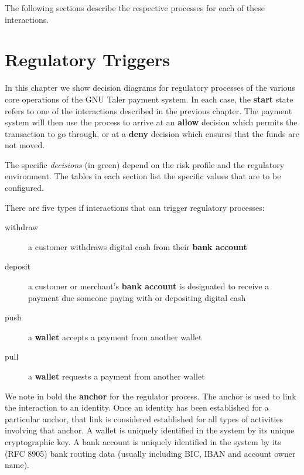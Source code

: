 \documentclass[10pt,a4paper,oneside]{book}
\begin{document}
The following sections describe the respective processes for each of these
interactions.










\chapter{Regulatory Triggers} \label{chap:triggers}

In this chapter we show decision diagrams for regulatory processes of the
various core operations of the GNU Taler payment system.  In each case, the
{\bf start} state refers to one of the interactions described in the previous
chapter.  The payment system will then use the process to arrive at an {\bf
  allow} decision which permits the transaction to go through, or at a {\bf
  deny} decision which ensures that the funds are not moved.

The specific {\em decisions} (in green) depend on the risk profile and the
regulatory environment. The tables in each section list the specific values
that are to be configured.

There are five types if interactions that can trigger regulatory processes:

\begin{description}
  \item[withdraw] a customer withdraws digital cash from their {\bf bank account}
  \item[deposit] a customer or merchant's {\bf bank account} is
    designated to receive a payment due someone paying with or
    depositing digital cash
  \item[push] a {\bf wallet} accepts a payment from another wallet
  \item[pull] a {\bf wallet} requests a payment from another wallet
\end{description}

We note in bold the {\bf anchor} for the regulator process. The anchor is used
to link the interaction to an identity.  Once an identity has been established
for a particular anchor, that link is considered established for all types of
activities involving that anchor.  A wallet is uniquely identified in the
system by its unique cryptographic key.  A bank account is uniquely identified
in the system by its (RFC 8905) bank routing data (usually including BIC, IBAN
and account owner name).
\end{document}

